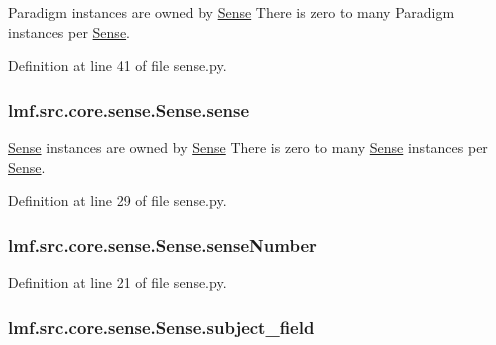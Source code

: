 Paradigm instances are owned by \hyperlink{classlmf_1_1src_1_1core_1_1sense_1_1_sense}{Sense} There is zero to many Paradigm instances per \hyperlink{classlmf_1_1src_1_1core_1_1sense_1_1_sense}{Sense}. 



Definition at line 41 of file sense.\+py.

\hypertarget{classlmf_1_1src_1_1core_1_1sense_1_1_sense_a51524fd8eb1bc869c2ecfc681339d8aa}{
\subsubsection[{sense}]{\setlength{\rightskip}{0pt plus 5cm}lmf.\+src.\+core.\+sense.\+Sense.\+sense}}\label{classlmf_1_1src_1_1core_1_1sense_1_1_sense_a51524fd8eb1bc869c2ecfc681339d8aa}


\hyperlink{classlmf_1_1src_1_1core_1_1sense_1_1_sense}{Sense} instances are owned by \hyperlink{classlmf_1_1src_1_1core_1_1sense_1_1_sense}{Sense} There is zero to many \hyperlink{classlmf_1_1src_1_1core_1_1sense_1_1_sense}{Sense} instances per \hyperlink{classlmf_1_1src_1_1core_1_1sense_1_1_sense}{Sense}. 



Definition at line 29 of file sense.\+py.

\hypertarget{classlmf_1_1src_1_1core_1_1sense_1_1_sense_ab511b70da3012cc5a0254f34dd30170c}{
\subsubsection[{sense\+Number}]{\setlength{\rightskip}{0pt plus 5cm}lmf.\+src.\+core.\+sense.\+Sense.\+sense\+Number}}\label{classlmf_1_1src_1_1core_1_1sense_1_1_sense_ab511b70da3012cc5a0254f34dd30170c}


Definition at line 21 of file sense.\+py.

\hypertarget{classlmf_1_1src_1_1core_1_1sense_1_1_sense_a1a7524732c66093f7156792292d3c9c3}{
\subsubsection[{subject\+\_\+field}]{\setlength{\rightskip}{0pt plus 5cm}lmf.\+src.\+core.\+sense.\+Sense.\+subject\+\_\+field}}\label{classlmf_1_1src_1_1core_1_1sense_1_1_sense_a1a7524732c66093f7156792292d3c9c3}


